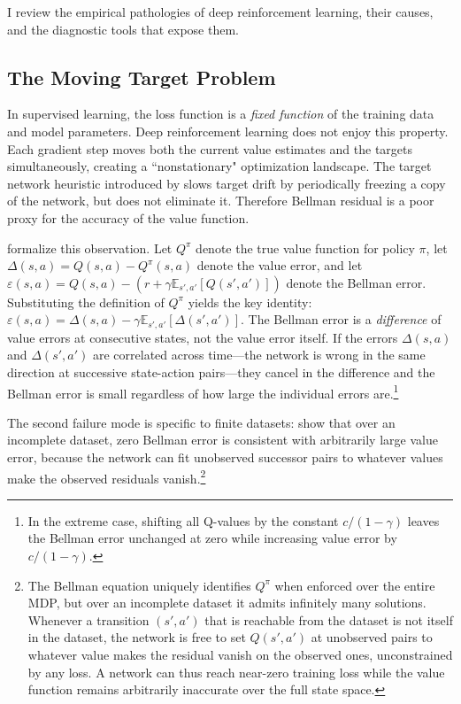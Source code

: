 
I review the empirical pathologies of deep reinforcement learning, their causes, and the diagnostic tools that expose them.

\subsection{The Moving Target Problem}
\label{sec:moving_target}

In supervised learning, the loss function is a \textit{fixed function} of the training data and model parameters. Deep reinforcement learning does not enjoy this property. Each gradient step moves both the current value estimates and the targets simultaneously, creating a ``nonstationary" optimization landscape. The target network heuristic introduced by \citet{mnih2015} slows target drift by periodically freezing a copy of the network, but does not eliminate it. Therefore Bellman residual is a poor proxy for the accuracy of the value function.

\citet{Fujimoto2022} formalize this observation. Let $Q^\pi$ denote the true value function for policy $\pi$, let $\Delta(s,a) = Q(s,a) - Q^\pi(s,a)$ denote the value error, and let $\varepsilon(s,a) = Q(s,a) - (r + \gamma \mathbb{E}_{s',a'}[Q(s',a')])$ denote the Bellman error. Substituting the definition of $Q^\pi$ yields the key identity: $\varepsilon(s,a) = \Delta(s,a) - \gamma \mathbb{E}_{s',a'}[\Delta(s',a')]$. The Bellman error is a \emph{difference} of value errors at consecutive states, not the value error itself. If the errors $\Delta(s,a)$ and $\Delta(s',a')$ are correlated across time---the network is wrong in the same direction at successive state-action pairs---they cancel in the difference and the Bellman error is small regardless of how large the individual errors are.\footnote{In the extreme case, shifting all Q-values by the constant $c/(1-\gamma)$ leaves the Bellman error unchanged at zero while increasing value error by $c/(1-\gamma)$.}

The second failure mode is specific to finite datasets: \citet[Corollary~1]{Fujimoto2022} show that over an incomplete dataset, zero Bellman error is consistent with arbitrarily large value error, because the network can fit unobserved successor pairs to whatever values make the observed residuals vanish.\footnote{The Bellman equation uniquely identifies $Q^\pi$ when enforced over the entire MDP, but over an incomplete dataset it admits infinitely many solutions. Whenever a transition $(s',a')$ that is reachable from the dataset is not itself in the dataset, the network is free to set $Q(s',a')$ at unobserved pairs to whatever value makes the residual vanish on the observed ones, unconstrained by any loss. A network can thus reach near-zero training loss while the value function remains arbitrarily inaccurate over the full state space.}

